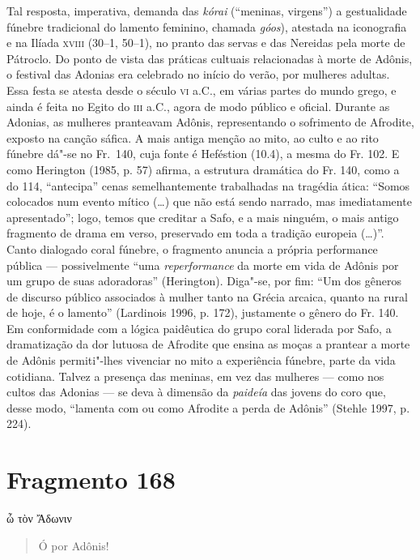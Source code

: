 {\pagebreak
Tal resposta, imperativa, demanda das \textit{kórai} (``meninas, virgens'') a gestualidade fúnebre tradicional do lamento feminino, chamada \textit{góos}), atestada na iconografia e na Ilíada \textsc{xviii} (30--1, 50--1), no pranto das servas e das Nereidas pela morte de Pátroclo.
Do ponto de vista das práticas cultuais relacionadas à morte de Adônis, o festival das Adonias 
era celebrado no início do verão, por mulheres adultas. Essa festa se atesta 
desde o século \textsc{vi} a.C., em várias partes do
mundo grego, e ainda é feita no Egito do \textsc{iii} a.C., agora de modo público e
oficial. Durante as Adonias, as mulheres pranteavam Adônis, representando o
sofrimento de Afrodite, exposto na canção sáfica. A mais antiga
menção ao mito, ao culto e ao rito fúnebre dá"-se no Fr.~140, cuja fonte é
Heféstion (10.4), a mesma do Fr. 102. E como Herington (1985, p. 57) afirma, a estrutura dramática do Fr. 140,  como a do 114, “antecipa” cenas semelhantemente trabalhadas na tragédia ática: “Somos colocados num evento mítico (\ldots{}) que não está sendo narrado, mas imediatamente apresentado”; logo,  temos que creditar a Safo, e a mais ninguém, o mais antigo fragmento de drama em verso, preservado em toda a tradição europeia (\ldots{})”. Canto dialogado coral fúnebre, o fragmento anuncia a própria performance pública --- possivelmente “uma \textit{reperformance} da morte em vida de Adônis por um grupo de suas adoradoras” (Herington). Diga"-se, por fim: “Um dos gêneros de discurso público associados à mulher tanto na Grécia arcaica, quanto na rural de hoje, é o lamento” (Lardinois 1996, p. 172), justamente o gênero do Fr. 140. Em conformidade com a lógica
paidêutica do grupo coral liderada por Safo, a dramatização da dor lutuosa de Afrodite que ensina as moças a prantear a morte de Adônis permiti"-lhes vivenciar no mito a experiência fúnebre, parte da vida cotidiana. Talvez a presença das meninas, em vez das mulheres --- como nos cultos das Adonias --- se deva à dimensão da \textit{paideía} das jovens do coro que, desse modo, “lamenta com ou como Afrodite a perda de Adônis” (Stehle 1997, p. 224). }

\pagebreak
\section{Fragmento 168}

\begin{gkverse}
ὦ τὸν Ἄδωνιν
\end{gkverse}

\begin{verse}
Ó por Adônis!
\end{verse}

